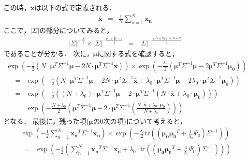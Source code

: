 \documentclass[a4j]{jarticle}
\begin{document}
この時，$\boldsymbol{\bar{x}}$は以下の式で定義される．
\begin{eqnarray}
\boldsymbol{\bar{x}} &=& \frac{1}{N} \sum_{n=1}^{N}{\boldsymbol{x_n}}
\end{eqnarray}
ここで，$|\Sigma|$の部分についてみると，
\begin{eqnarray}
|\Sigma|^{- \frac{N}{2}} \times |\Sigma|^{- \frac{\nu_0 + D + 1}{2}} &=& |\Sigma|^{- \frac{(N+\nu_0) + D + 2}{2}}
\end{eqnarray}
であることが分かる．
次に，$\boldsymbol{\mu}$に関する式を確認すると，
\begin{eqnarray}
\exp{\left( -\frac{1}{2} \left( N \cdot \boldsymbol{\mu}^T\Sigma^{-1}\boldsymbol{\mu} - 2 N \cdot \boldsymbol{\mu}^T\Sigma^{-1}\boldsymbol{\bar{x}}\right) \right)} \times \exp{\left(- \frac{\lambda_0}{2} \left( \boldsymbol{\mu}^T \Sigma^{-1}\boldsymbol{\mu} - 2 \boldsymbol{\mu}^T \Sigma^{-1} \boldsymbol{\mu_0} \right) \right)}
\end{eqnarray}
\begin{eqnarray}
&=& \exp{\left( - \frac{1}{2} \left( N \cdot \boldsymbol{\mu}^T\Sigma^{-1}\boldsymbol{\mu} - 2 N \cdot \boldsymbol{\mu}^T\Sigma^{-1}\boldsymbol{\bar{x}}  + \lambda_0 \cdot \boldsymbol{\mu}^T \Sigma^{-1}\boldsymbol{\mu} - 2 \lambda_0 \cdot \boldsymbol{\mu}^T \Sigma^{-1} \boldsymbol{\mu_0} \right)\right)}\\
&=& \exp{\left( - \frac{1}{2} \left( (N + \lambda_0) \cdot \boldsymbol{\mu}^T\Sigma^{-1}\boldsymbol{\mu} - 2 \cdot \boldsymbol{\mu}^T\Sigma^{-1} (N \cdot \boldsymbol{\bar{x}} + \lambda_0 \cdot \boldsymbol{\mu_0}) \right)\right)}\\
&=& \exp{\left( - \frac{N + \lambda_0}{2} \left( \boldsymbol{\mu}^T\Sigma^{-1}\boldsymbol{\mu} - 2 \cdot \boldsymbol{\mu}^T\Sigma^{-1} \left(\frac{N \cdot \boldsymbol{\bar{x}} + \lambda_0  \cdot \boldsymbol{\mu_0}}{N + \lambda_0}\right) \right)\right)} \label{calc:NIW_post_nu_lambda}
\end{eqnarray}
となる．
最後に，残った項($\boldsymbol{\mu}$の0次の項)について考えると，
\begin{eqnarray}
\exp{\left( - \frac{1}{2} \sum_{n=1}^{N}{\boldsymbol{x_n}^T \Sigma^{-1} \boldsymbol{x_n}} \right)} \times \exp{\left( - \frac{\lambda_0}{2} \textrm{tr}\left(\left( \boldsymbol{\mu_0} \boldsymbol{\mu_0}^T + \frac{1}{\lambda_0} \Psi_0 \right) \Sigma^{-1} \right) \right)}
\end{eqnarray}
\begin{eqnarray}
&=& \exp{\left( - \frac{1}{2} \left( \sum_{n=1}^{N}{\boldsymbol{x_n}^T \Sigma^{-1} \boldsymbol{x_n}} + \lambda_0 \cdot \textrm{tr}\left(\left( \boldsymbol{\mu_0} \boldsymbol{\mu_0}^T + \frac{1}{\lambda_0} \Psi_0 \right) \Sigma^{-1} \right) \right) \right)}
\end{eqnarray}
\end{document}
